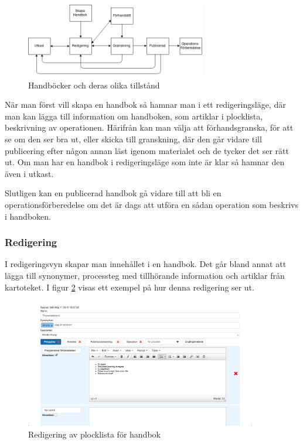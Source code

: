 \begin{figure}[h!]
  \centering
  \includegraphics[width=0.7\textwidth]{images/model}
  \caption{Handböcker och deras olika tillstånd}
  \label{fig:model}
\end{figure}

När man först vill skapa en handbok så hamnar man i ett redigeringsläge,
där man kan lägga till information om handboken, som artiklar i plocklista,
beskrivning av operationen. Härifrån kan man välja att förhandsgranska, för att se om den ser bra ut,
eller skicka till granskning, där den går vidare till publicering
efter någon annan läst igenom materialet och de tycker det ser rätt ut.
Om man har en handbok i redigeringsläge som inte är klar så hamnar den även i
utkast.

Slutligen kan en publicerad handbok gå vidare till att bli en
operationsförberedelse om det är dags att utföra en sådan operation
som beskrivs i handboken.

\subsubsection{Redigering}
I redigeringsvyn skapar man innehållet i en handbok. Det går bland annat att lägga till synonymer, processteg med tillhörande information och artiklar från kartoteket. I figur \ref{fig:handboksredigering} visas ett exempel på hur denna redigering ser ut. 

\begin{figure}[h!]
  \centering
  \includegraphics[width=0.9\textwidth]{images/site/handboksredigering}
  \caption{Redigering av plocklista för handbok}
  \label{fig:handboksredigering}
\end{figure}


